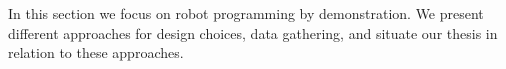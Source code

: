 In this section we focus on robot programming by demonstration.
We present different approaches for design choices, data gathering, and situate our thesis in relation to these approaches.







